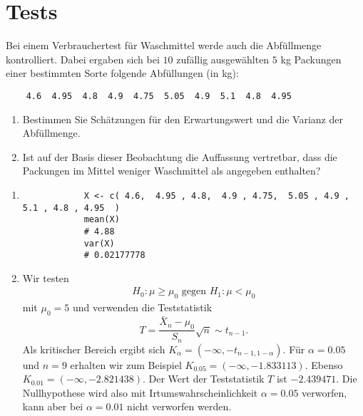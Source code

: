 \section{Tests}


 Bei einem Verbrauchertest für Waschmittel werde auch 
die Abfüllmenge kontrolliert. Dabei ergaben sich bei $10$ zufällig ausgewählten $5$ kg
Packungen einer bestimmten Sorte folgende Abfüllungen (in kg):
\begin{lstlisting}
    4.6  4.95  4.8  4.9  4.75  5.05  4.9  5.1  4.8  4.95
\end{lstlisting}
\begin{enumerate}
    \item Bestimmen Sie Schätzungen für den Erwartungswert und die Varianz 
        der Abfüllmenge.
    \item Ist auf der Basis dieser Beobachtung die Auffassung vertretbar, 
        dass die Packungen im Mittel weniger Waschmittel als angegeben enthalten?
\end{enumerate}

\solution
\begin{enumerate}
    \item
        \begin{lstlisting}
            X <- c( 4.6,  4.95 , 4.8,  4.9 , 4.75,  5.05 , 4.9 , 5.1 , 4.8 , 4.95  )
            mean(X)
            # 4.88
            var(X)
            # 0.02177778
        \end{lstlisting}

    \item Wir testen
        \begin{align*}
            H_0: \mu \geq \mu_0 \text{ gegen } H_1: \mu < \mu_0
        \end{align*}
        mit $\mu_0=5$ und verwenden die Teststatistik
        \begin{equation*}
            T = \frac{\bar X_n - \mu_0}{ S_n } \sqrt{n} \sim t_{n-1}.
        \end{equation*}
        Als kritischer Bereich ergibt sich $K_{\alpha} = ( -\infty, -t_{n-1,
        1-\alpha})$.  Für $\alpha = 0.05$ und $n=9$ erhalten wir zum Beispiel
        $K_{0.05} = (-\infty, -1.833113)$. Ebenso $K_{0.01} = (-\infty,
        -2.821438 )$.  Der Wert der Teststatistik $T$ ist $-2.439471$. Die
        Nullhypothese wird also mit Irtumswahrscheinlichkeit $\alpha=0.05$
        verworfen, kann aber bei $\alpha=0.01$ nicht verworfen werden. 
\end{enumerate}

